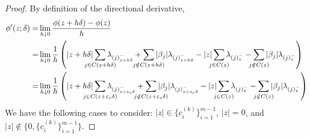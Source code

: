 \begin{proof}
  By definition of the directional derivative,
  \begin{align}
    \phi'(z; \delta)
    = & \lim_{h \downarrow 0} \frac{\phi(z + h \delta) - \phi(z)}{h} \nonumber \\
    = &
    \lim_{h \downarrow 0} \frac{1}{h}
    \left(
      |z + h \delta| \smashoperator{\sum_{j \in C(z + h \delta)}} \lambda_{(j)^-_{z + h \delta}}
      + \smashoperator{\sum_{j \notin C(z + h\delta)}} |\beta_j| \lambda_{(j)^-_{z + h \delta}}
      - |z| \smashoperator{\sum_{j \in C(z)}} \lambda_{(j)^-_z}
      - \smashoperator{\sum_{j \notin C(z)}} |\beta_j| \lambda_{(j)^-_z}
    \right) \nonumber                                                          \\
    = & \lim_{h \downarrow 0}
    \frac{1}{h}
    \left(
      |z + h \delta| \smashoperator{\sum_{j \in C(z + {\varepsilon_c}\delta)}} \lambda_{(j)^-_{z + {\varepsilon_c}\delta}}
      + \smashoperator{\sum_{j \notin C(z + {\varepsilon_c}\delta)}} |\beta_j| \lambda_{(j)^-_{z + {\varepsilon_c}\delta}}
      - |z| \smashoperator{\sum_{j \in C(z)}} \lambda_{(j)^-_{z}}
      - \smashoperator{\sum_{j \notin C(z)}} |\beta_j| \lambda_{(j)^-_{z}}
    \right)
    \label{eq:directional-derivative-sl1}
  \end{align}
  We have the following cases to consider: \(|z| \in \{c_i^{(k)}\}_{i=1}^{m-1}\),
  \(|z| = 0\), and \(|z| \notin \{0, \{c_i^{(k)}\}_{i=1}^{m-1}\}\).


\end{proof}
